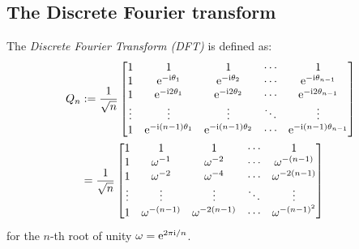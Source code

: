 \subsection{The Discrete Fourier transform}
\begin{definition}[DFT] The \emph{Discrete Fourier Transform (DFT)} is defined as:
\begin{align*}
Q_n &:= {1 \over \sqrt{n}} \begin{bmatrix} 1 & 1 & 1&  \ensuremath{\cdots} & 1 \\
                                    1 & {\rm e}^{-\I \ensuremath{\theta}_1} & {\rm e}^{-\I \ensuremath{\theta}_2} & \ensuremath{\cdots} & {\rm e}^{-\I \ensuremath{\theta}_{n-1}} \\
                                    1 & {\rm e}^{-\I 2 \ensuremath{\theta}_1} & {\rm e}^{-\I 2 \ensuremath{\theta}_2} & \ensuremath{\cdots} & {\rm e}^{-\I 2\ensuremath{\theta}_{n-1}} \\
                                    \ensuremath{\vdots} & \ensuremath{\vdots} & \ensuremath{\vdots} & \ensuremath{\ddots} & \ensuremath{\vdots} \\
                                    1 & {\rm e}^{-\I (n-1) \ensuremath{\theta}_1} & {\rm e}^{-\I (n-1) \ensuremath{\theta}_2} & \ensuremath{\cdots} & {\rm e}^{-\I (n-1) \ensuremath{\theta}_{n-1}}
\end{bmatrix} \\
&= {1 \over \sqrt{n}} \begin{bmatrix} 1 & 1 & 1&  \ensuremath{\cdots} & 1 \\
                                    1 & \ensuremath{\omega}^{-1} & \ensuremath{\omega}^{-2} & \ensuremath{\cdots} & \ensuremath{\omega}^{-(n-1)}\\
                                    1 & \ensuremath{\omega}^{-2} & \ensuremath{\omega}^{-4} & \ensuremath{\cdots} & \ensuremath{\omega}^{-2(n-1)}\\
                                    \ensuremath{\vdots} & \ensuremath{\vdots} & \ensuremath{\vdots} & \ensuremath{\ddots} & \ensuremath{\vdots} \\
                                    1 & \ensuremath{\omega}^{-(n-1)} & \ensuremath{\omega}^{-2(n-1)} & \ensuremath{\cdots} & \ensuremath{\omega}^{-(n-1)^2}
\end{bmatrix}
\end{align*}
for the $n$-th root of unity $\omega = {\rm e}^{2\pi{\rm i}/n}$.  \end{definition}

